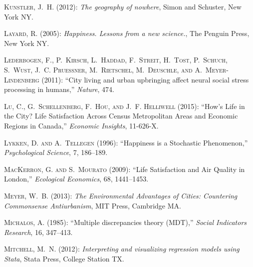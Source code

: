 \documentclass[12pt, letterpaper]{article}
\begin{document}
\begin{spacing}{1.9}
\begin{thebibliography}{77}
\textsc{Kunstler, J.~H.} (2012): \emph{The geography of nowhere}, Simon and
  Schuster, New York NY.

\textsc{Layard, R.} (2005): \emph{Happiness. Lessons from a new science.}, The
  Penguin Press, New York NY.

\textsc{Lederbogen, F., P.~Kirsch, L.~Haddad, F.~Streit, H.~Tost, P.~Schuch,
  S.~Wust, J.~C. Pruessner, M.~Rietschel, M.~Deuschle, and
  A.~{Meyer-Lindenberg}} (2011): \enquote{City living and urban upbringing
  affect neural social stress processing in humans,} \emph{Nature}, 474.

\textsc{Lu, C., G.~Schellenberg, F.~Hou, and J.~F. Helliwell} (2015):
  \enquote{How's Life in the City? Life Satisfaction Across Census Metropolitan
  Areas and Economic Regions in Canada,} \emph{Economic Insights}, 11-626-X.

\textsc{Lykken, D. and A.~Tellegen} (1996): \enquote{Happiness is a Stochastic
  Phenomenon,} \emph{Psychological Science}, 7, 186--189.

\textsc{MacKerron, G. and S.~Mourato} (2009): \enquote{Life Satisfaction and
  Air Quality in London,} \emph{Ecological Economics}, 68, 1441--1453.

\textsc{Meyer, W.~B.} (2013): \emph{The Environmental Advantages of Cities:
  Countering Commonsense Antiurbanism}, MIT Press, Cambridge MA.

\textsc{Michalos, A.} (1985): \enquote{Multiple discrepancies theory (MDT),}
  \emph{Social Indicators Research}, 16, 347--413.

\textsc{Mitchell, M.~N.} (2012): \emph{Interpreting and
  visualizing regression models using Stata}, Stata Press, College Station TX.


\end{thebibliography}
\end{spacing}
\end{document}
